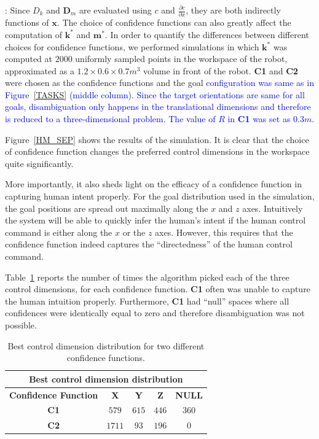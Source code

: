 \documentclass[conference]{IEEEtran}
\begin{document}
: Since $D_{k}$ and $\boldsymbol{D}_{m}$ are evaluated using $c$ and $\frac{\partial c}{\partial x}$, they are both indirectly functions of $\boldsymbol{x}$. The choice of confidence functions can also greatly affect the computation of $\boldsymbol{k}^*$ and $\boldsymbol{m}^*$. In order to quantify the differences between different choices for confidence functions, we performed simulations in which $\boldsymbol{k}^*$ was computed at $2000$ uniformly sampled points in the workspace of the robot, approximated as a $1.2\times0.6\times0.7 m^3$ volume in front of the robot. \textbf{C1} and \textbf{C2} were chosen as the confidence functions and the goal \textcolor{blue}{configuration was same as in Figure~\ref{TASKS} (middle column). Since the target orientations are same for all goals, disambiguation only happens in the translational dimensions and therefore is reduced to a three-dimensional problem. The value of $R$ in \textbf{C1} was set as $0.3m$.} 

Figure~\ref{HM_SEP} shows the results of the simulation. It is clear that the choice of confidence function changes the preferred control dimensions in the workspace quite significantly. 

More importantly, it also sheds light on the efficacy of a confidence function in capturing human intent properly. For the goal distribution used in the simulation, the goal positions are spread out maximally along the $x$ and $z$ axes. Intuitively the system will be able to quickly infer the human's intent if the human control command is either along the $x$ or the $z$ axes. However, this requires that the confidence function indeed captures the ``directedness'' of the human control command. 

Table~\ref{HMD} reports the number of times the algorithm picked each of the three control dimensions, for each confidence function.  
\textbf{C1} often was unable to capture the human intuition properly. Furthermore, \textbf{C1} had ``null'' spaces where all confidences were identically equal to zero and therefore disambiguation was not possible.
\begin{table}[t]
	\centering
	\begin{tabular}{|c|c|c|c|c|}
		\hline
		\multicolumn{5}{|c|}{Best control dimension distribution} \\
		\hline
		\textbf{Confidence Function} & \textbf{X} & \textbf{Y} & \textbf{Z} & \textbf{NULL} \\ \hline
		
		\textbf{C1} & $579$ & $615$ & $446$ & $360$ \\ \hline
		\textbf{C2} & $1711$ & $93$ & $196$ & $0$\\ \hline
		
	\end{tabular}
	\vspace{.2cm}
	\caption{Best control dimension distribution for two different confidence functions.} 
	\label{HMD}
	\vspace{-.5cm}
\end{table}
\end{document}
